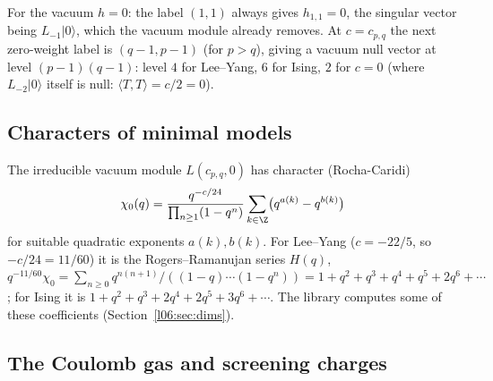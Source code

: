 For the vacuum $h = 0$: the label $(1,1)$ always gives $h_{1,1} = 0$, the singular vector being
$L_{-1}|0\rangle$, which the vacuum module already removes. At $c = c_{p,q}$ the next zero-weight label
is $(q-1,p-1)$ (for $p>q$), giving a vacuum null vector at level $(p-1)(q-1)$: level $4$ for
Lee--Yang, $6$ for Ising, $2$ for $c = 0$ (where $L_{-2}|0\rangle$ itself is null: $\langle T,T\rangle = c/2 = 0$).

\subsection{Characters of minimal models}

The irreducible vacuum module $L(c_{p,q},0)$ has character (Rocha-Caridi)
\begin{equation*}
 \chi_{0}(q) = \frac{q^{-c/24}}{\prod_{n\ge1}(1-q^n)}\sum_{k\in\Z}\bigl(q^{a(k)}-q^{b(k)}\bigr)
\end{equation*}
for suitable quadratic exponents $a(k),b(k)$. For Lee--Yang ($c=-22/5$, so $-c/24 = 11/60$) it is the Rogers--Ramanujan series $H(q)$,
$q^{-11/60}\chi_0 = \sum_{n\ge0}q^{n(n+1)}/((1-q)\cdots(1-q^n)) = 1+q^2+q^3+q^4+q^5+2q^6+\cdots$;
for Ising it is $1+q^2+q^3+2q^4+2q^5+3q^6+\cdots$. The library computes some of these coefficients
(Section~\ref{l06:sec:dims}).

\subsection{The Coulomb gas and screening charges}

